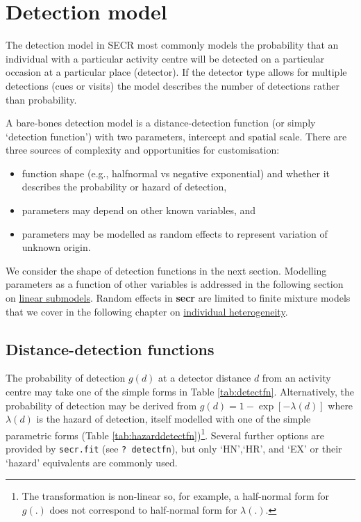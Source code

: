\documentclass[
]{book}
\providecommand{\tightlist}{%
  \setlength{\itemsep}{0pt}\setlength{\parskip}{0pt}}
\begin{document}
\chapter{Detection model}\label{Detection}

The detection model in SECR most commonly models the probability that an individual with a particular activity centre will be detected on a particular occasion at a particular place (detector). If the detector type allows for multiple detections (cues or visits) the model describes the number of detections rather than probability.

A bare-bones detection model is a distance-detection function (or simply `detection function') with two parameters, intercept and spatial scale. There are three sources of complexity and opportunities for customisation:

\begin{itemize}
\tightlist
\item
  function shape (e.g., halfnormal vs negative exponential) and whether it describes the
  probability or hazard of detection,
\item
  parameters may depend on other known variables, and
\item
  parameters may be modelled as random effects to represent variation of unknown origin.
\end{itemize}

We consider the shape of detection functions in the next section. Modelling parameters as a function of other variables is addressed in the following section on \hyperref[linear-submodels]{linear submodels}. Random effects in \textbf{secr} are limited to finite mixture models that we cover in the following chapter on \hyperref[individual-heterogeneity]{individual heterogeneity}.

\section{Distance-detection functions}\label{detectfn}


The probability of detection \(g(d)\) at a detector distance \(d\) from an activity centre may take one of the simple forms in Table \ref{tab:detectfn}. Alternatively, the probability of detection may be derived from \(g(d) = 1 - \exp[-\lambda(d)]\) where \(\lambda(d)\) is the hazard of detection, itself modelled with one of the simple parametric forms (Table \ref{tab:hazarddetectfn})\footnote{The transformation is non-linear so, for example, a half-normal form for \(g(.)\) does not correspond to half-normal form for \(\lambda(.)\).}.
Several further options are provided by \texttt{secr.fit} (see \texttt{?\ detectfn}), but only `HN',`HR', and `EX' or their `hazard' equivalents are commonly used.
\end{document}
